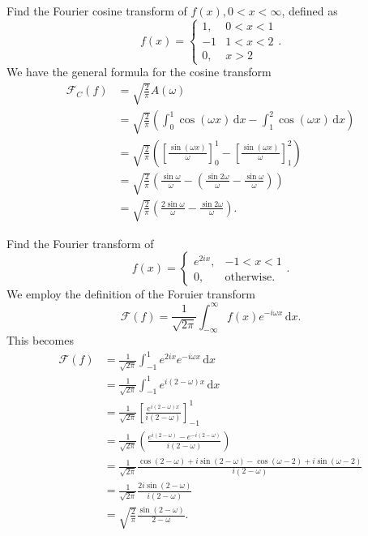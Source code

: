 Find the Fourier cosine transform of $f(x), 0 < x < \infty$, defined as
\[ 
f(x) = \begin{cases}
1, & 0<x<1\\
-1 & 1<x<2 \\
0, & x > 2
\end{cases}
.\]
\hr
We have the general formula for the cosine transform
\begin{align*}
  \mathcal{F}_C (f) &= \sqrt{\frac{2}{\pi}} A(\omega) \\
          &= \sqrt{\frac{2}{\pi}} \left( \int_{0}^{1} \cos (\omega x) \, \mathrm{d}x - \int_{1}^{2} \cos (\omega x) \, \mathrm{d}x  \right) \\
          &= \sqrt{\frac{2}{\pi}} \left( \left[ \frac{\sin (\omega x) }{\omega} \right]_0^{1} - \left[ \frac{\sin (\omega x)}{\omega} \right]_1^{2} \right) \\
          &= \sqrt{\frac{2}{\pi}} \left( \frac{\sin \omega}{\omega} - \left( \frac{\sin 2 \omega}{\omega} - \frac{\sin \omega}{\omega} \right) \right) \\
          &= \sqrt{\frac{2}{\pi}} \left( \frac{2 \sin \omega}{\omega} - \frac{\sin 2\omega}{\omega} \right)
.\end{align*} 



Find the Fourier transform of
\[ 
f(x) = \begin{cases}
e^{2ix}, & -1 < x < 1\\
0, & \text{otherwise}
.\end{cases}
.\]
\hr
We employ the definition of the Foruier transform
\[ 
\mathcal{F}(f) = \frac{1}{\sqrt{2\pi}} \int_{-\infty}^{\infty} f(x) e^{-i \omega x} \, \mathrm{d}x 
.\]
This becomes
\begin{align*}
  \mathcal{F}(f) &= \frac{1}{\sqrt{2\pi}} \int_{-1}^{1} e^{2ix} e^{-i\omega x} \, \mathrm{d}x \\
       &= \frac{1}{\sqrt{2\pi}} \int_{-1}^{1} e^{i (2 - \omega)x} \, \mathrm{d}x  \\
       &= \frac{1}{\sqrt{2\pi}} \left[ \frac{e^{i(2 - \omega) x}}{i (2 - \omega)} \right]_{-1}^{1}   \\
       &= \frac{1}{\sqrt{2\pi}} \left( \frac{e^{i (2 - \omega)} - e^{-i (2-\omega)}}{i (2 - \omega)} \right) \\
       &= \frac{1}{\sqrt{2\pi}} \frac{\cos (2 -\omega) + i \sin (2 - \omega) - \cos (\omega - 2) + i \sin(\omega - 2)}{i (2 - \omega)} \\
       &= \frac{1}{\sqrt{2 \pi}} \frac{2i \sin (2 - \omega)}{i (2 - \omega)} \\
       &= \sqrt{\frac{2}{\pi}} \frac{\sin (2 - \omega)}{2 - \omega}
.\end{align*} 


